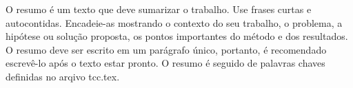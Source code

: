 O resumo é um texto que deve sumarizar o trabalho.
Use frases curtas e autocontidas. 
Encadeie-as mostrando o contexto do seu trabalho, o problema, a hipótese ou solução proposta, os pontos importantes do método e dos resultados.
O resumo deve ser escrito em um parágrafo único, portanto, é recomendado escrevê-lo após o texto estar pronto. 
O resumo é seguido de palavras chaves definidas no arqivo tcc.tex.